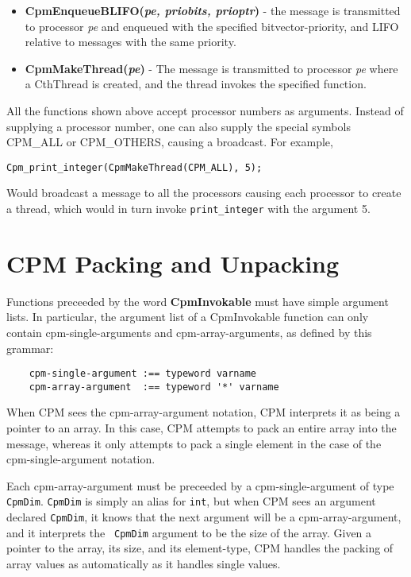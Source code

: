 \begin{itemize}
\item[]{{\bf CpmEnqueueBLIFO({\it pe, priobits, prioptr})} - the
message is transmitted to processor {\it pe} and enqueued with the
specified bitvector-priority, and LIFO relative to messages with the
same priority.}

\item[]{{\bf CpmMakeThread({\it pe})} - The message is transmitted to
processor {\it pe} where a CthThread is created, and the thread
invokes the specified function.}

\end{itemize}

All the functions shown above accept processor numbers as arguments.
Instead of supplying a processor number, one can also supply the
special symbols CPM\_ALL or CPM\_OTHERS, causing a broadcast.  For
example,

\begin{verbatim}
Cpm_print_integer(CpmMakeThread(CPM_ALL), 5);
\end{verbatim}

Would broadcast a message to all the processors causing each processor
to create a thread, which would in turn invoke {\tt print\_integer}
with the argument 5.

\section{CPM Packing and Unpacking}

Functions preceeded by the word {\bf CpmInvokable} must have simple
argument lists.  In particular, the argument list of a CpmInvokable
function can only contain cpm-single-arguments and cpm-array-arguments,
as defined by this grammar:

\begin{verbatim}
    cpm-single-argument :== typeword varname
    cpm-array-argument  :== typeword '*' varname
\end{verbatim}

When CPM sees the cpm-array-argument notation, CPM interprets it as
being a pointer to an array.  In this case, CPM attempts to pack an
entire array into the message, whereas it only attempts to pack a
single element in the case of the cpm-single-argument notation.

Each cpm-array-argument must be preceeded by a cpm-single-argument of
type {\tt CpmDim}.  {\tt CpmDim} is simply an alias for {\tt int}, but
when CPM sees an argument declared {\tt CpmDim}, it knows that the
next argument will be a cpm-array-argument, and it interprets the {\tt
CpmDim} argument to be the size of the array.  Given a pointer to the
array, its size, and its element-type, CPM handles the packing of
array values as automatically as it handles single values.

